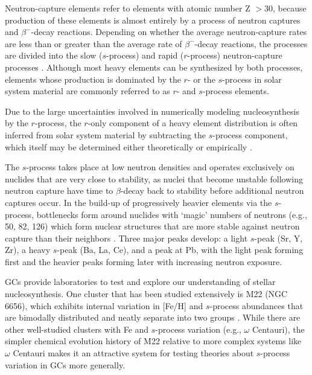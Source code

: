 Neutron-capture elements refer to elements with atomic number Z $>30$, because production of these elements is almost entirely by a process of neutron captures and $\beta^-$-decay reactions. Depending on whether the average neutron-capture rates are less than or greater than the average rate of $\beta^-$-decay reactions, the processes are divided into the slow ($s$-process) and rapid ($r$-process) neutron-capture processes \citep{Burbidge:1957hf}. Although most heavy elements can be synthesized by both processes, elements whose production is dominated by the $r$- or the $s$-process in solar system material are commonly referred to as $r$- and $s$-process elements.

Due to the large uncertainties involved in numerically modeling nucleosynthesis by the $r$-process, the $r$-only component of a heavy element distribution is often inferred from solar system material by subtracting the $s$-process component, which itself may be determined either theoretically \citep[e.g.,][]{Arlandini:1999eh,Goriely:1999wj,Sneden:2008cf} or empirically \citep[e.g.,][]{Simmerer:2004ib}.

The $s$-process takes place at low neutron densities \citep[$\leq 10^{14}$ cm$^{-3}$;][]{Busso:1999ig} and operates exclusively on nuclides that are very close to stability, as nuclei that become unstable following neutron capture have time to $\beta$-decay back to stability before additional neutron captures occur. In the build-up of progressively heavier elements via the $s$-process, bottlenecks form around nuclides with `magic' numbers of neutrons (e.g., 50, 82, 126) which form nuclear structures that are more stable against neutron capture than their neighbors \citep{Busso:1999ig}. Three major peaks develop: a light $s$-peak (Sr, Y, Zr), a heavy $s$-peak (Ba, La, Ce), and a peak at Pb, with the light peak forming first and the heavier peaks forming later with increasing neutron exposure.

GCs provide laboratories to test and explore our understanding of stellar nucleosynthesis. One cluster that has been studied extensively is M22 (NGC 6656), which exhibits internal variation in [Fe/H] and $s$-process abundances that are bimodally distributed and neatly separate into two groups \citep{Marino:2009je,Marino:2011kz,DaCosta:2011jh}. While there are other well-studied clusters with Fe and $s$-process variation (e.g., $\omega$ Centauri), the simpler chemical evolution history of M22 relative to more complex systems like $\omega$ Centauri makes it an attractive system for testing theories about $s$-process variation in GCs more generally.

